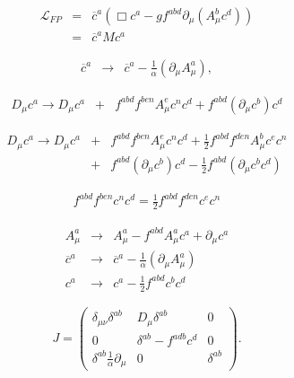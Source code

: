 \documentclass[a4paper,11pt]{article} %
\numberwithin{equation}{section} %
\numberwithin{figure}{section} %
\theoremstyle{plain} %
\theoremstyle{definition} %
\theoremstyle{remark} %
\begin{document}
\begin{eqnarray}
 \mathcal{L}_{FP} &=&  \overline{c}^{a} \left( \Box c^{a} -g f^{abd} \partial_{\mu} \left( A^{b}_{\mu} c^{d} \right) \right) \\
                  &=&  \overline{c}^{a} M  c^{a}
\end{eqnarray}

\begin{eqnarray}
 \overline{c}^{a} &\rightarrow& \overline{c}^{a} - \frac{1}{\alpha} \left( \partial_{\mu} A^{a}_{\mu} \right) ,
\end{eqnarray}

\begin{eqnarray}
 D_{\mu}c^{a}  \rightarrow  D_{\mu}c^{a} &+& f^{abd} f^{ben} A^{e}_{\mu} c^{n} c^{d}  +  f^{abd} \left(  \partial_{\mu} c^{b} \right) c^{d}  
\end{eqnarray}

\begin{eqnarray}
 D_{\mu}c^{a}  \rightarrow  D_{\mu}c^{a} &+& f^{abd} f^{ben} A^{e}_{\mu} c^{n} c^{d}  
+  \frac{1}{2} f^{abd} f^{den} A^{b}_{\mu} c^{e} c^{n}  \nonumber \\
                                         &+& f^{abd} \left(  \partial_{\mu} c^{b} \right) c^{d}  
- \frac{1}{2}  f^{abd}  \left( \partial_{\mu} c^{b} c^{d} \right)  
\end{eqnarray}

\begin{eqnarray}
 f^{abd} f^{ben} c^{n} c^{d}  = \frac{1}{2} f^{abd} f^{den} c^{e} c^{n}
\end{eqnarray}

\begin{eqnarray}
 A^{a}_{\mu}    &\rightarrow&    A^{a}_{\mu} - f^{abd} A^{a}_{\mu} c^{a} + \partial_{\mu}c^{a} \\
 \overline{c}^{a} &\rightarrow& \overline{c}^{a} - \frac{1}{\alpha} \left( \partial_{\mu} A^{a}_{\mu} \right) \\
c^{a} &\rightarrow& c^{a} - \frac{1}{2} f^{abd} c^{b} c^{d}
\end{eqnarray}

\begin{equation}
J= \left(
 \begin{array}{lcr}
    \delta_{\mu \nu} \delta^{ab}                     & D_{\mu} \delta^{ab}              & 0   \\
    0                                                & \delta^{ab} - f^{adb} c^{d}      & 0   \\
    \delta^{ab} \frac{1}{\alpha}\partial_{\mu}       & 0                                 &\delta^{ab}  
 \end{array} \right).
\end{equation}
\end{document}
